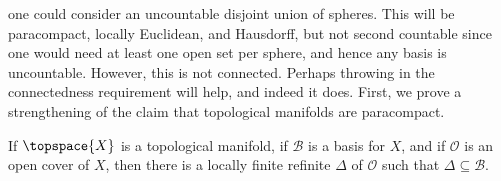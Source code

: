             one could consider an uncountable disjoint union of spheres. This
            will be paracompact, locally Euclidean, and Hausdorff, but not
            second countable since one would need at least one open set per
            sphere, and hence any basis is uncountable. However, this is not
            connected. Perhaps throwing in the connectedness requirement will
            help, and indeed it does. First, we prove a strengthening of the
            claim that topological manifolds are paracompact.
            \begin{theorem}
                If $\topspace{X}$ is a topological manifold, if $\mathcal{B}$ is
                a basis for $X$, and if $\mathcal{O}$ is an open cover of $X$,
                then there is a locally finite refinite $\Delta$ of
                $\mathcal{O}$ such that $\Delta\subseteq\mathcal{B}$.
            \end{theorem}
